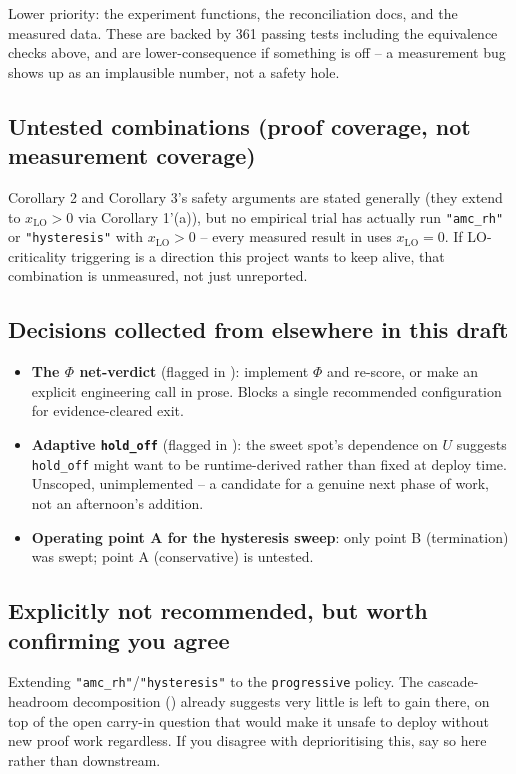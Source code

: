 \documentclass{article}
\begin{document}
Lower priority: the experiment functions, the reconciliation docs, and the measured data. These
are backed by 361 passing tests including the equivalence checks above, and are lower-consequence
if something is off -- a measurement bug shows up as an implausible number, not a safety hole.

\subsection{Untested combinations (proof coverage, not measurement coverage)}

Corollary 2 and Corollary 3's safety arguments are stated generally (they extend to
$x_{\mathrm{LO}} > 0$ via Corollary 1'(a)), but no empirical trial has actually run
\texttt{"amc\_rh"} or \texttt{"hysteresis"} with $x_{\mathrm{LO}} > 0$ -- every measured result in
 uses $x_{\mathrm{LO}} = 0$. If LO-criticality triggering is a direction
this project wants to keep alive, that combination is unmeasured, not just unreported.

\subsection{Decisions collected from elsewhere in this draft}

\begin{itemize}
\item \textbf{The $\Phi$ net-verdict} (flagged in ): implement $\Phi$ and
  re-score, or make an explicit engineering call in prose. Blocks a single recommended
  configuration for evidence-cleared exit.
\item \textbf{Adaptive \texttt{hold\_off}} (flagged in ): the sweet spot's
  dependence on $U$ suggests \texttt{hold\_off} might want to be runtime-derived rather than
  fixed at deploy time. Unscoped, unimplemented -- a candidate for a genuine next phase of work,
  not an afternoon's addition.
\item \textbf{Operating point A for the hysteresis sweep}: only point B (termination) was swept;
  point A (conservative) is untested.
\end{itemize}

\subsection{Explicitly not recommended, but worth confirming you agree}

Extending \texttt{"amc\_rh"}/\texttt{"hysteresis"} to the \texttt{progressive} policy. The
cascade-headroom decomposition () already suggests very little is left to
gain there, on top of the open carry-in question that would make it unsafe to deploy without new
proof work regardless. If you disagree with deprioritising this, say so here rather than
downstream.
\end{document}
